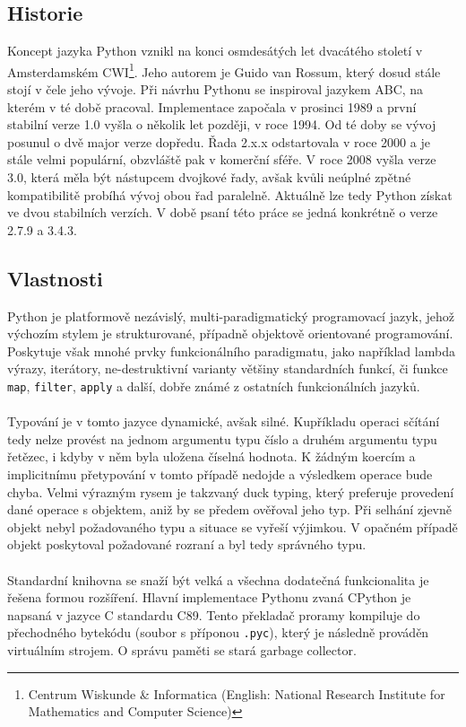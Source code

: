 \documentclass[
  field=inf,
  biblatex,
  glossaries,
  index
]{kidiplom}
\begin{document}
	\subsection{Historie}
	Koncept jazyka Python vznikl na konci osmdesátých let dvacátého století v Amsterdamském CWI\footnote{Centrum Wiskunde \& Informatica (English: National Research Institute for Mathematics and Computer Science)}. Jeho autorem je Guido van Rossum, který dosud stále stojí v čele jeho vývoje. Při návrhu Pythonu se inspiroval jazykem ABC, na kterém v té době pracoval. Implementace započala v prosinci 1989 a první stabilní verze 1.0 vyšla o několik let později, v roce 1994. Od té doby se vývoj posunul o dvě major verze dopředu. Řada 2.x.x odstartovala v roce 2000 a je stále velmi populární, obzvláště pak v komerční sféře.  V roce 2008 vyšla verze 3.0, která měla být nástupcem dvojkové řady, avšak kvůli neúplné zpětné kompatibilitě probíhá vývoj obou řad paralelně. Aktuálně lze tedy Python získat ve dvou stabilních verzích. V době psaní této práce se jedná konkrétně o verze 2.7.9 a 3.4.3.

	\subsection{Vlastnosti}
	Python je platformově nezávislý, multi-paradigmatický programovací jazyk, jehož výchozím stylem je strukturované, případně objektově orientované programování. Poskytuje však mnohé prvky funkcionálního paradigmatu, jako například lambda výrazy, iterátory, ne-destruktivní varianty většiny standardních funkcí, či funkce \texttt{map}, \texttt{filter}, \texttt{apply} a další, dobře známé z ostatních funkcionálních jazyků.
	\\
	\\
	Typování je v tomto jazyce dynamické, avšak silné. Kupříkladu operaci sčítání tedy nelze provést na jednom argumentu typu číslo a druhém argumentu typu řetězec, i kdyby v něm byla uložena číselná hodnota. K žádným koercím a implicitnímu přetypování v tomto případě nedojde a výsledkem operace bude chyba. Velmi výrazným rysem je takzvaný duck typing, který preferuje provedení dané operace s objektem, aniž by se předem ověřoval jeho typ. Při selhání zjevně objekt nebyl požadovaného typu a situace se vyřeší výjimkou. V opačném případě objekt poskytoval požadované rozraní a byl tedy správného typu.
	\\
	\\
	Standardní knihovna se snaží být  velká a všechna dodatečná funkcionalita je řešena formou rozšíření. Hlavní implementace Pythonu zvaná CPython je napsaná v jazyce C standardu C89. Tento překladač proramy kompiluje do přechodného bytekódu (soubor s příponou \texttt{.pyc}), který je následně prováděn virtuálním strojem. O správu paměti se stará garbage collector.
\end{document}
